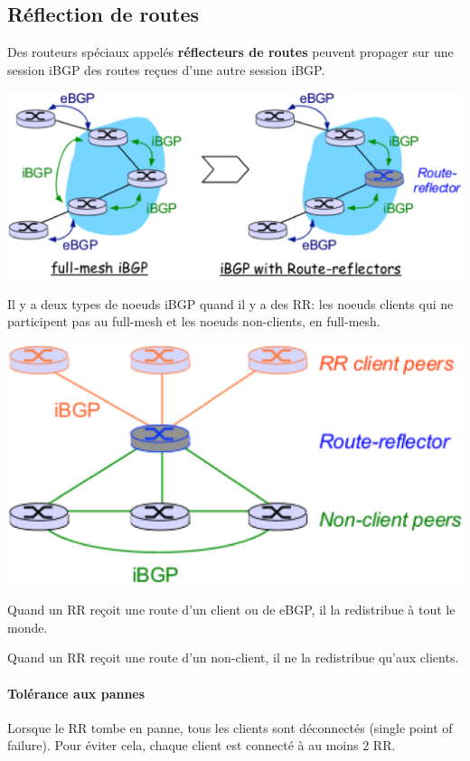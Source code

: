 \documentclass{report}
\begin{document}
\subsection{Réflection de routes}

Des routeurs spéciaux appelés \textbf{réflecteurs de routes} peuvent
propager sur une session iBGP des routes reçues d'une autre session
iBGP.

\includegraphics[width=\textwidth]{routereflection.eps}

Il y a deux types de noeuds iBGP quand il y a des RR: les noeuds
clients qui ne participent pas au full-mesh et les noeuds non-clients,
en full-mesh.

\includegraphics[width=\textwidth]{rrclients.eps}

Quand un RR reçoit une route d'un client ou de eBGP, il la redistribue
à tout le monde.

Quand un RR reçoit une route d'un non-client, il ne la redistribue
qu'aux clients.

\paragraph{Tolérance aux pannes}

Lorsque le RR tombe en panne, tous les clients sont déconnectés
(single point of failure). Pour éviter cela, chaque client est
connecté à au moins 2 RR.
\end{document}
